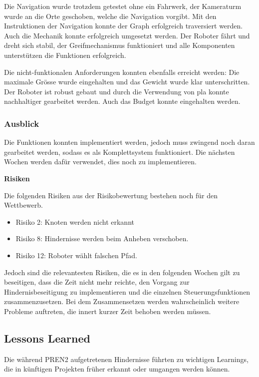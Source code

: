 Die Navigation wurde trotzdem getestet ohne ein Fahrwerk, der Kameraturm wurde an die Orte geschoben, welche die Navigation vorgibt. Mit den Instruktionen der Navigation konnte der Graph erfolgreich traversiert werden. Auch die Mechanik konnte erfolgreich umgesetzt werden. Der Roboter fährt und dreht sich stabil, der Greifmechanismus funktioniert und alle Komponenten unterstützen die Funktionen erfolgreich.

Die nicht-funktionalen Anforderungen konnten ebenfalls erreicht werden: Die maximale Grösse wurde eingehalten und das Gewicht wurde klar unterschritten. Der Roboter ist robust gebaut und durch die Verwendung von \acrshort{pla} konnte nachhaltiger gearbeitet werden. Auch das Budget konnte eingehalten werden.

\subsubsection{Ausblick}

Die Funktionen konnten implementiert werden, jedoch muss zwingend noch daran gearbeitet werden, sodass es als Komplettsystem funktioniert. Die nächsten Wochen werden dafür verwendet, dies noch zu implementieren.

\textbf{Risiken}

Die folgenden Risiken aus der Risikobewertung bestehen noch für den Wettbewerb. 

\begin{itemize}
    \item Risiko 2: Knoten werden nicht erkannt
    \item Risiko 8: Hindernisse werden beim Anheben verschoben.
    \item Risiko 12: Roboter wählt falschen Pfad.
\end{itemize}

Jedoch sind die relevantesten Risiken, die es in den folgenden Wochen gilt zu beseitigen, dass die Zeit nicht mehr reichte, den Vorgang zur Hindernisbeseitigung zu implementieren und die einzelnen Steuerungsfunktionen zusammenzusetzen.
Bei dem Zusammensetzen werden wahrscheinlich weitere Probleme auftreten, die innert kurzer Zeit behoben werden müssen.



\subsection{Lessons Learned}

Die während PREN2 aufgetretenen Hindernisse führten zu wichtigen Learnings, die in künftigen Projekten früher erkannt oder umgangen werden können.

